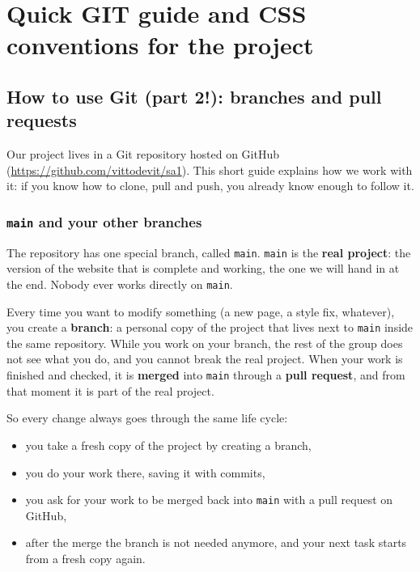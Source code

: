\section{Quick GIT guide and CSS conventions for the project}
\label{sec:coordination}

\subsection{How to use Git (part 2!): branches and pull requests}
\label{sec:git}

Our project lives in a Git repository hosted on GitHub
(\url{https://github.com/vittodevit/sa1}). This short guide explains how we
work with it: if you know how to clone, pull and push, you already know
enough to follow it.

\subsubsection{\texttt{main} and your other branches}
\label{sec:git-idea}

The repository has one special branch, called \texttt{main}. \texttt{main}
is the \textbf{real project}: the version of the website that is complete and
working, the one we will hand in at the end. Nobody ever works directly on
\texttt{main}.

Every time you want to modify something (a new page, a style fix, whatever),
you create a \textbf{branch}: a personal copy of the project that lives next
to \texttt{main} inside the same repository. While you work on your branch,
the rest of the group does not see what you do, and you cannot break the real
project. When your work is finished and checked, it is \textbf{merged} into
\texttt{main} through a \textbf{pull request}, and from that moment it is
part of the real project.

So every change always goes through the same life cycle:
\begin{itemize}
\item you take a fresh copy of the project by creating a branch,
\item you do your work there, saving it with commits,
\item you ask for your work to be merged back into \texttt{main} with a
pull request on GitHub,
\item after the merge the branch is not needed anymore, and your next task
starts from a fresh copy again.
\end{itemize}

